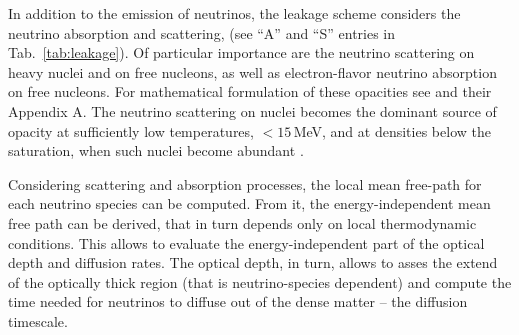 In addition to the emission of neutrinos, the leakage scheme considers the neutrino absorption 
and scattering, (see ``A'' and ``S'' entries in Tab.~\ref{tab:leakage}).
%
Of particular importance are the neutrino scattering on heavy nuclei and on free nucleons, 
as well as electron-flavor neutrino absorption on free nucleons. 
For mathematical formulation of these opacities see \citet{Galeazzi:2013mia} 
and their Appendix A.
%
The neutrino scattering on nuclei becomes the dominant source of opacity 
at sufficiently low temperatures, $<15\,$MeV, and at densities below 
the saturation, when such nuclei become abundant \citep{Rosswog:2003rv}.

Considering scattering and absorption processes, the local mean 
free-path for each neutrino species can be computed. From it, the 
energy-independent mean free path can be derived, that in turn depends 
only on local thermodynamic conditions. This allows to evaluate the 
energy-independent part of the optical depth and diffusion rates.
%
The optical depth, in turn, allows to asses the extend of the optically thick region 
(that is neutrino-species dependent) and compute the time needed 
for neutrinos to diffuse out of the dense matter -- the diffusion timescale. 
%

%

